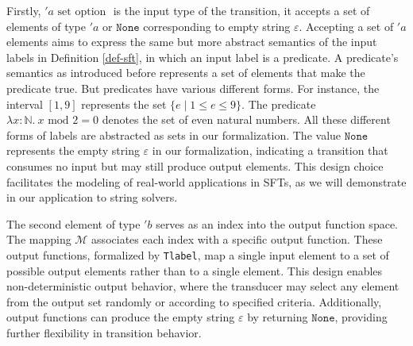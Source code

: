 \documentclass[a4paper,UKenglish,cleveref, autoref, anonymous, thm-restate]{lipics-v2021}
\begin{document}
Firstly, $'a \text{ set option }$ is the input type of the transition, it accepts a set of elements of type $'a$ or $\texttt{None}$ corresponding to empty string $\varepsilon$. 
Accepting a set of $'a$ elements aims to express the same but more abstract semantics of the input labels in Definition \ref{def-sft}, in which an input label is a predicate. A predicate's semantics as introduced before represents a set of elements that make the predicate true. But predicates have various different forms. For instance, the interval $[1, 9]$ represents the set $\{e \mid 1 \leq e \leq 9\}$. The predicate $\lambda x \colon \mathbb{N}.~ x \text{ mod } 2 = 0$ denotes the set of even natural numbers. All these different forms of labels are abstracted as sets in our formalization.
%
The value $\texttt{None}$ represents the empty string $\varepsilon$ in our formalization, indicating a transition that consumes no input but may still produce output elements. This design choice facilitates the modeling of real-world applications in SFTs, as we will demonstrate in our application to string solvers.

The second element of type $'b$ serves as an index into the output function space. The mapping $\mathcal{M}$ associates each index with a specific output function. These output functions, formalized by \texttt{Tlabel}, map a single input element to a set of possible output elements rather than to a single element. This design enables non-deterministic output behavior, where the transducer may select any element from the output set randomly or according to specified criteria. Additionally, output functions can produce the empty string $\varepsilon$ by returning $\texttt{None}$, providing further flexibility in transition behavior.

\end{document}
